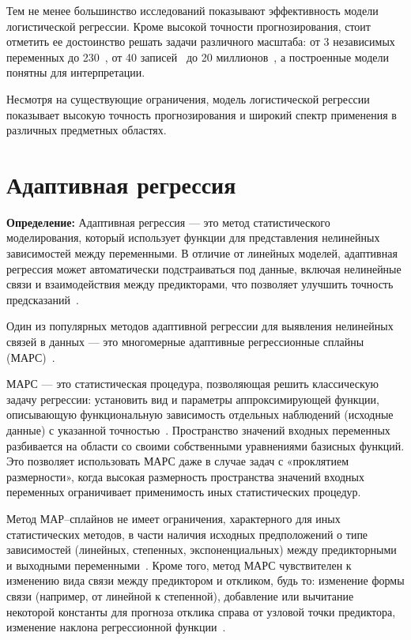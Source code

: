 Тем не менее большинство исследований показывают эффективность модели логистической регрессии.
Кроме высокой точности прогнозирования, стоит отметить ее достоинство решать задачи различного масштаба: от 3 независимых~\cite{simonova} переменных до 230~\cite{osikov}, от 40 записей~\cite{bogdanov} до 20 миллионов~\cite{seredniy}, а построенные модели понятны для интерпретации.

Несмотря на существующие ограничения, модель логистической регрессии показывает высокую точность прогнозирования и широкий спектр применения в различных предметных областях.


\section{Адаптивная регрессия}

\textbf{ Определение:} Адаптивная регрессия --- это метод статистического моделирования, который использует функции для представления нелинейных зависимостей между переменными.
В отличие от линейных моделей, адаптивная регрессия может автоматически подстраиваться под данные, включая нелинейные связи и взаимодействия между предикторами, что позволяет улучшить точность предсказаний~\cite{friedman2}.

Один из популярных методов адаптивной регрессии для выявления нелинейных связей в данных --- это многомерные адаптивные регрессионные сплайны (МАРС)~\cite{friedman2}.

МАРС --- это статистическая процедура, позволяющая решить классическую задачу регрессии: установить вид и параметры аппроксимирующей функции, описывающую функциональную зависимость отдельных наблюдений (исходные данные) с указанной точностью~\cite{romanova}.
Пространство значений входных переменных разбивается на области со своими собственными уравнениями базисных функций.
Это позволяет использовать МАРС даже в случае задач с «проклятием размерности», когда высокая размерность пространства значений входных переменных ограничивает применимость иных статистических процедур.

Метод МАР--сплайнов не имеет ограничения, характерного для иных статистических методов, в части наличия исходных предположений о типе зависимостей (линейных, степенных, экспоненциальных) между предикторными и выходными переменными~\cite{romanova}.
Кроме того, метод МАРС чувствителен к изменению вида связи между предиктором и откликом, будь то: изменение формы связи (например, от линейной к степенной), добавление или вычитание некоторой константы для прогноза отклика справа от узловой точки предиктора, изменение наклона регрессионной функции~\cite{romanova}.

